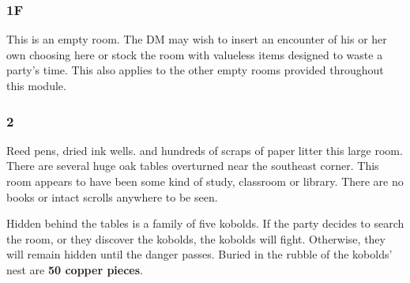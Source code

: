 \documentclass[palace_of_the_silver_princess]{subfiles}
\begin{document}
\subsubsection{1F}

This is an empty room. The DM may wish to insert an encounter of his
or her own choosing here or stock the room with valueless items designed
to waste a party’s time. This also applies to the other empty rooms
provided throughout this module.

\subsubsection{2}

\begin{quotebox}
    Reed pens, dried ink wells. and hundreds of scraps of paper litter
    this large room. There are several huge oak tables overturned near
    the southeast corner. This room appears to have been some kind of
    study, classroom or library. There are no books or intact scrolls
    anywhere to be seen.
\end{quotebox}

Hidden behind the tables is a family of five kobolds.  If the party
decides to search the room, or they discover the kobolds, the kobolds
will fight. Otherwise, they will remain hidden until the danger passes.
Buried in the rubble of the kobolds’ nest are \textbf{50 copper pieces}.
\end{document}
